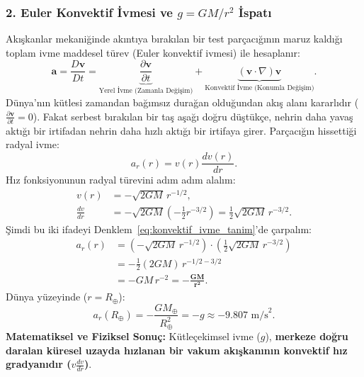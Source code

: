 \subsubsection{2. Euler Konvektif İvmesi ve \texorpdfstring{$g = GM/r^2$}{g = GM/r\texttwosuperior{}} İspatı}
Akışkanlar mekaniğinde akıntıya bırakılan bir test parçacığının maruz kaldığı toplam ivme maddesel türev (Euler konvektif ivmesi) ile hesaplanır:
\begin{equation}
    \mathbf{a} = \frac{D\mathbf{v}}{Dt} = \underbrace{\frac{\partial \mathbf{v}}{\partial t}}_{\text{Yerel İvme (Zamanla Değişim)}} + \underbrace{(\mathbf{v} \cdot \nabla)\mathbf{v}}_{\text{Konvektif İvme (Konumla Değişim)}}.
    \label{eq:maddesel_turev}
\end{equation}
Dünya'nın kütlesi zamandan bağımsız durağan olduğundan akış alanı kararlıdır ($\frac{\partial \mathbf{v}}{\partial t} = 0$). Fakat serbest bırakılan bir taş aşağı doğru düştükçe, nehrin daha yavaş aktığı bir irtifadan nehrin daha hızlı aktığı bir irtifaya girer. Parçacığın hissettiği radyal ivme:
\begin{equation}
    a_r(r) = v(r) \frac{dv(r)}{dr}.
    \label{eq:konvektif_ivme_tanim}
\end{equation}
Hız fonksiyonunun radyal türevini adım adım alalım:
\begin{align}
    v(r)          & = -\sqrt{2GM} \, r^{-1/2}, \label{eq:adim1}                                                               \\
    \frac{dv}{dr} & = -\sqrt{2GM} \left( -\frac{1}{2} r^{-3/2} \right) = \frac{1}{2} \sqrt{2GM} \, r^{-3/2}. \label{eq:adim2}
\end{align}
Şimdi bu iki ifadeyi Denklem~\eqref{eq:konvektif_ivme_tanim}'de çarpalım:
\begin{align}
    a_r(r) & = \left( -\sqrt{2GM} \, r^{-1/2} \right) \cdot \left( \frac{1}{2} \sqrt{2GM} \, r^{-3/2} \right) \nonumber \\
           & = -\frac{1}{2} (2GM) \, r^{-1/2 - 3/2} \nonumber                                                           \\
           & = -GM \, r^{-2} = \mathbf{-\frac{GM}{r^2}}.
    \label{eq:g_ispat_sonuc}
\end{align}
Dünya yüzeyinde ($r = R_\oplus$):
\begin{equation}
    a_r(R_\oplus) = -\frac{GM_\oplus}{R_\oplus^2} = -g \approx -9.807\text{ m/s}^2.
\end{equation}
\textbf{Matematiksel ve Fiziksel Sonuç:} Kütleçekimsel ivme ($g$), \textbf{merkeze doğru daralan küresel uzayda hızlanan bir vakum akışkanının konvektif hız gradyanıdır ($v \frac{dv}{dr}$)}.

